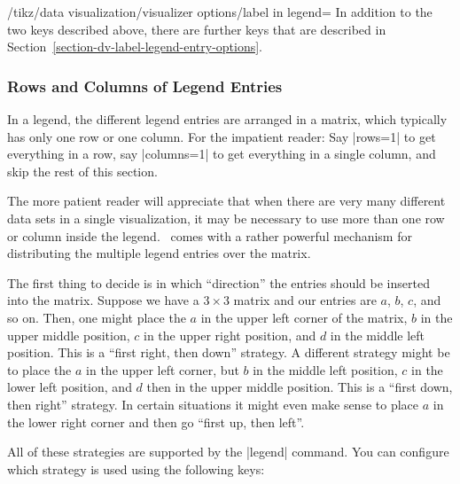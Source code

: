 \begin{key}{/tikz/data visualization/visualizer options/label in legend=}
    In addition to the two keys described above, there are further keys that
    are described in Section~\ref{section-dv-label-legend-entry-options}.
\end{key}


\subsubsection{Rows and Columns of Legend Entries}

In a legend, the different legend entries are arranged in a matrix, which
typically has only one row or one column. For the impatient reader: Say
|rows=1| to get everything in a row, say |columns=1| to get everything in a
single column, and skip the rest of this section.

The more patient reader will appreciate that when there are very many different
data sets in a single visualization, it may be necessary to use more than one
row or column inside the legend. \tikzname\ comes with a rather powerful
mechanism for distributing the multiple legend entries over the matrix.

The first thing to decide is in which ``direction'' the entries should be
inserted into the matrix. Suppose we have a $3 \times 3$ matrix and our entries
are $a$, $b$, $c$, and so on. Then, one might place the $a$ in the upper left
corner of the matrix, $b$ in the upper middle position, $c$ in the upper right
position, and $d$ in the middle left position. This is a ``first right, then
down'' strategy. A different strategy might be to place the $a$ in the upper
left corner, but $b$ in the middle left position, $c$ in the lower left
position, and $d$ then in the upper middle position. This is a ``first down,
then right'' strategy. In certain situations it might even make sense to place
$a$ in the lower right corner and then go ``first up, then left''.

All of these strategies are supported by the |legend| command. You can
configure which strategy is used using the following keys:


